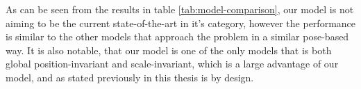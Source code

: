 As can be seen from the results in table \ref{tab:model-comparison}, our model is not aiming to be the current state-of-the-art in it's category, however the performance is similar to the other models that approach the problem in a similar pose-based way. It is also notable, that our model is one of the only models that is both global position-invariant and scale-invariant, which is a large advantage of our model, and as stated previously in this thesis is by design.